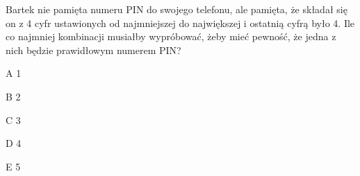\begin{tresc}
Bartek nie pamięta numeru PIN do swojego telefonu, ale pamięta, że składał się on z 4 cyfr ustawionych od najmniejszej do największej i ostatnią cyfrą było 4. Ile co najmniej kombinacji musiałby wypróbować, żeby mieć pewność, że jedna z nich będzie prawidłowym numerem PIN?
\end{tresc}
\begin{wariant}{A} 1 \end{wariant}
\begin{wariant}{B} 2 \end{wariant}
\begin{wariant}{C} 3 \end{wariant}
\begin{wariant}{D} 4 \end{wariant}
\begin{wariant}{E} 5 \end{wariant}
